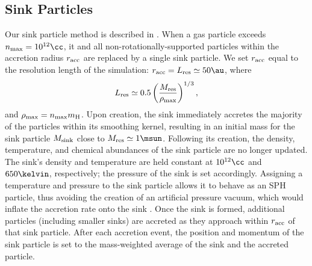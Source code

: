 \subsection{Sink Particles}
\label{sinkParticles}
Our sink particle method is described in \citet{StacyGreifBromm2010}. When a gas particle exceeds $n_{\rm max} = 10^{12}\cc$, it and all non-rotationally-supported particles within the accretion radius $r_{\rm acc}$ are replaced by a single sink particle.  We set $r_{\rm acc}$ equal to the resolution length of the simulation: $r_{\rm acc} = L_{\rm res} \simeq 50\au$, where 
\begin{equation}
L_{\rm res} \simeq 0.5 \left( \frac{M_{\rm res}}{\rho_{\rm max}} \right)^{1/3},
\end{equation}
and $\rho_{\rm max} = n_{\rm max} m_{\rm H}$.  Upon creation, the sink immediately accretes the majority of the particles within its smoothing kernel, resulting in an initial mass for the sink particle $M_{\rm sink}$ close to $M_{\rm res} \simeq 1\msun$.  Following its creation, the density, temperature, and chemical abundances of the sink particle are no longer updated.  The sink's density and temperature are held constant at $10^{12}\cc$ and $650\kelvin$, respectively; the pressure of the sink is set accordingly. Assigning a temperature and pressure to the sink particle allows it to behave as an SPH particle, thus avoiding the creation of an artificial pressure vacuum, which would inflate the accretion rate onto the sink \citep[see][]{BrommCoppiLarson2002, MartelEvansShapiro2006}. Once the sink is formed, additional particles (including smaller sinks) are accreted as they approach within $r_{\rm acc}$ of that sink particle.  After each accretion event, the position and momentum of the sink particle is set to the mass-weighted average of the sink and the accreted particle.